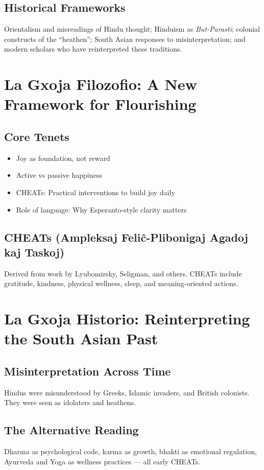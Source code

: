 \documentclass[12pt]{article}
\begin{document}
\subsection{Historical Frameworks}
Orientalism and misreadings of Hindu thought; Hinduism as \textit{But-Parasti}; colonial constructs of the “heathen”; South Asian responses to misinterpretation; and modern scholars who have reinterpreted these traditions.

\section{La Gxoja Filozofio: A New Framework for Flourishing}
\subsection{Core Tenets}
\begin{itemize}[leftmargin=*, label=--]
  \item Joy as foundation, not reward
  \item Active vs passive happiness
  \item CHEATs: Practical interventions to build joy daily
  \item Role of language: Why Esperanto-style clarity matters
\end{itemize}

\subsection{CHEATs (Ampleksaj Feliĉ-Plibonigaj Agadoj kaj Taskoj)}
Derived from work by Lyubomirsky, Seligman, and others. CHEATs include gratitude, kindness, physical wellness, sleep, and meaning-oriented actions.

\section{La Gxoja Historio: Reinterpreting the South Asian Past}
\subsection{Misinterpretation Across Time}
Hindus were misunderstood by Greeks, Islamic invaders, and British colonists. They were seen as idolaters and heathens.

\subsection{The Alternative Reading}
Dharma as psychological code, karma as growth, bhakti as emotional regulation, Ayurveda and Yoga as wellness practices — all early CHEATs.
\end{document}
